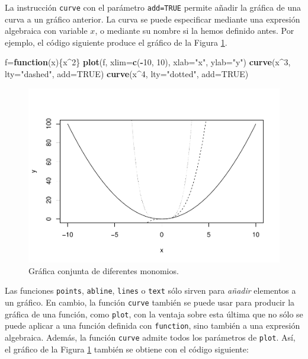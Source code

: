 \documentclass[
]{book}
\newenvironment{Shaded}{\begin{snugshade}}{\end{snugshade}}
\newcommand{\ControlFlowTok}[1]{\textcolor[rgb]{0.13,0.29,0.53}{\textbf{#1}}}
\newcommand{\DataTypeTok}[1]{\textcolor[rgb]{0.13,0.29,0.53}{#1}}
\newcommand{\DecValTok}[1]{\textcolor[rgb]{0.00,0.00,0.81}{#1}}
\newcommand{\KeywordTok}[1]{\textcolor[rgb]{0.13,0.29,0.53}{\textbf{#1}}}
\newcommand{\NormalTok}[1]{#1}
\newcommand{\OperatorTok}[1]{\textcolor[rgb]{0.81,0.36,0.00}{\textbf{#1}}}
\newcommand{\OtherTok}[1]{\textcolor[rgb]{0.56,0.35,0.01}{#1}}
\newcommand{\StringTok}[1]{\textcolor[rgb]{0.31,0.60,0.02}{#1}}
\theoremstyle{definition}
\theoremstyle{definition}
\theoremstyle{definition}
\theoremstyle{remark}
\begin{document}
La instrucción \texttt{curve} con el parámetro \texttt{add=TRUE} permite añadir la gráfica de una curva a un gráfico anterior. La curva se puede especificar mediante una expresión algebraica con variable \(x\), o mediante su nombre si la hemos definido antes. Por ejemplo, el código siguiente produce el gráfico de la Figura \ref{fig:mons}.

\begin{Shaded}
\begin{Highlighting}[]
\NormalTok{f=}\ControlFlowTok{function}\NormalTok{(x)\{x}\OperatorTok{\^{}}\DecValTok{2}\NormalTok{\}}
\KeywordTok{plot}\NormalTok{(f, }\DataTypeTok{xlim=}\KeywordTok{c}\NormalTok{(}\OperatorTok{{-}}\DecValTok{10}\NormalTok{, }\DecValTok{10}\NormalTok{), }\DataTypeTok{xlab=}\StringTok{"x"}\NormalTok{, }\DataTypeTok{ylab=}\StringTok{"y"}\NormalTok{)}
\KeywordTok{curve}\NormalTok{(x}\OperatorTok{\^{}}\DecValTok{3}\NormalTok{, }\DataTypeTok{lty=}\StringTok{"dashed"}\NormalTok{, }\DataTypeTok{add=}\OtherTok{TRUE}\NormalTok{)}
\KeywordTok{curve}\NormalTok{(x}\OperatorTok{\^{}}\DecValTok{4}\NormalTok{, }\DataTypeTok{lty=}\StringTok{"dotted"}\NormalTok{, }\DataTypeTok{add=}\OtherTok{TRUE}\NormalTok{) }
\end{Highlighting}
\end{Shaded}

\begin{figure}

{\centering \includegraphics[width=0.9\linewidth]{07chap06_Graficos_I_files/figure-latex/mons-1} 

}

\caption{Gráfica conjunta de diferentes monomios.}\label{fig:mons}
\end{figure}

Las funciones \texttt{points}, \texttt{abline}, \texttt{lines} o \texttt{text} sólo sirven para \emph{añadir} elementos a un gráfico. En cambio, la función \texttt{curve} también se puede usar para producir la gráfica de una función, como \texttt{plot}, con la ventaja sobre esta última que no sólo se puede aplicar a una función definida con \texttt{function}, sino también a una expresión algebraica. Además, la función \texttt{curve} admite todos los parámetros de \texttt{plot}. Así, el gráfico de la Figura \ref{fig:mons} también se obtiene con el código siguiente:
\end{document}
